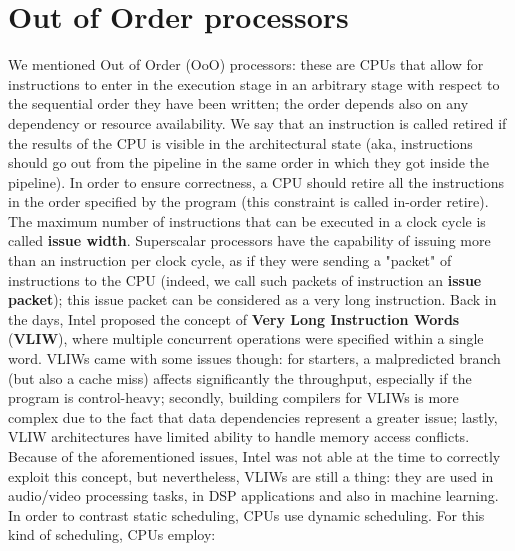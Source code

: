 \section{Out of Order processors}

We mentioned Out of Order (OoO) processors: these are CPUs that allow for instructions to enter in the execution stage in an arbitrary stage with respect to the sequential order they have been written; the order depends also on any dependency or resource availability. We say that an instruction is called retired if the results of the CPU is visible in the architectural state (aka, instructions should go out from the pipeline in the same order in which they got inside the pipeline). In order to ensure correctness, a CPU should retire all the instructions in the order specified by the program (this constraint is called in-order retire).
\nwl
The maximum number of instructions that can be executed in a clock cycle is called \textbf{issue width}. Superscalar processors have the capability of issuing more than an instruction per clock cycle, as if they were sending a "packet" of instructions to the CPU (indeed, we call such packets of instruction an \textbf{issue packet}); this issue packet can be considered as a very long instruction. Back in the days, Intel proposed the concept of \textbf{Very Long Instruction Words} (\textbf{VLIW}), where multiple concurrent operations were specified within a single word.
\nwl
VLIWs came with some issues though: for starters, a malpredicted branch (but also a cache miss) affects significantly the throughput, especially if the program is control-heavy; secondly, building compilers for VLIWs is more complex due to the fact that data dependencies represent a greater issue; lastly, VLIW architectures have limited ability to handle memory access conflicts.
\nwl
Because of the aforementioned issues, Intel was not able at the time to correctly exploit this concept, but nevertheless, VLIWs are still a thing: they are used in audio/video processing tasks, in DSP applications and also in machine learning. 
\nwl
In order to contrast static scheduling, CPUs use dynamic scheduling. For this kind of scheduling, CPUs employ:
